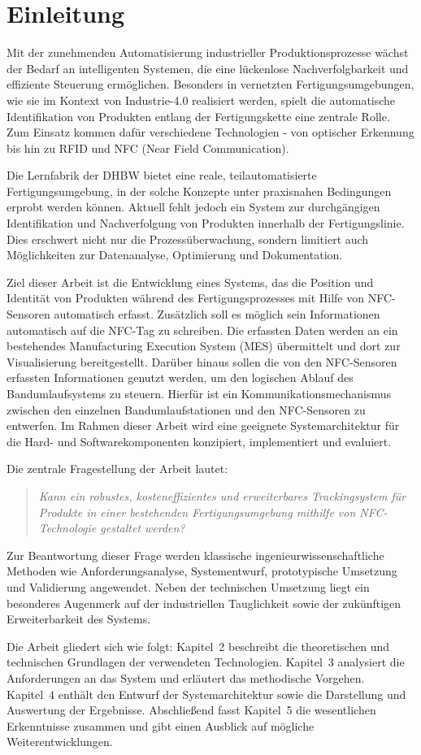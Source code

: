 \chapter{Einleitung}
\label{cha:Einleitung}

Mit der zunehmenden Automatisierung industrieller Produktionsprozesse wächst der Bedarf an intelligenten Systemen, die eine lückenlose Nachverfolgbarkeit und effiziente Steuerung ermöglichen.
Besonders in vernetzten Fertigungsumgebungen, wie sie im Kontext von Industrie-4.0 realisiert werden, spielt die automatische Identifikation von Produkten entlang der Fertigungskette eine zentrale Rolle. Zum Einsatz kommen dafür verschiedene Technologien - von optischer Erkennung bis hin zu RFID und NFC (Near Field Communication).

Die Lernfabrik der DHBW bietet eine reale, teilautomatisierte Fertigungsumgebung, in der solche Konzepte unter praxisnahen Bedingungen erprobt werden können. Aktuell fehlt jedoch ein System zur durchgängigen Identifikation und Nachverfolgung von Produkten innerhalb der Fertigungslinie. Dies erschwert nicht nur die Prozessüberwachung, sondern limitiert auch Möglichkeiten zur Datenanalyse, Optimierung und Dokumentation.

Ziel dieser Arbeit ist die Entwicklung eines Systems, das die Position und Identität von Produkten während des Fertigungsprozesses mit Hilfe von NFC-Sensoren automatisch erfasst. Zusätzlich soll es möglich sein Informationen automatisch auf die NFC-Tag zu schreiben. Die erfassten Daten werden an ein bestehendes Manufacturing Execution System (MES) übermittelt und dort zur Visualisierung bereitgestellt. Darüber hinaus sollen die von den NFC-Sensoren erfassten Informationen genutzt werden, um den logischen Ablauf des Bandumlaufsystems zu steuern. Hierfür ist ein Kommunikationsmechanismus zwischen den einzelnen Bandumlaufstationen und den NFC-Sensoren zu entwerfen. Im Rahmen dieser Arbeit wird eine geeignete Systemarchitektur für die Hard- und Softwarekomponenten konzipiert, implementiert und evaluiert.

Die zentrale Fragestellung der Arbeit lautet:
\begin{quote}
	\textit{Kann ein robustes, kosteneffizientes und erweiterbares Trackingsystem für Produkte in einer bestehenden Fertigungsumgebung mithilfe von NFC-Technologie gestaltet werden?}
\end{quote}


Zur Beantwortung dieser Frage werden klassische ingenieurwissenschaftliche Methoden wie Anforderungsanalyse, Systementwurf, prototypische Umsetzung und Validierung angewendet. Neben der technischen Umsetzung liegt ein besonderes Augenmerk auf der industriellen Tauglichkeit sowie der zukünftigen Erweiterbarkeit des Systems.

Die Arbeit gliedert sich wie folgt:  
Kapitel~2 beschreibt die theoretischen und technischen Grundlagen der verwendeten Technologien. Kapitel~3 analysiert die Anforderungen an das System und erläutert das methodische Vorgehen. Kapitel~4 enthält den Entwurf der Systemarchitektur sowie die Darstellung und Auswertung der Ergebnisse. Abschließend fasst Kapitel~5 die wesentlichen Erkenntnisse zusammen und gibt einen Ausblick auf mögliche Weiterentwicklungen.
